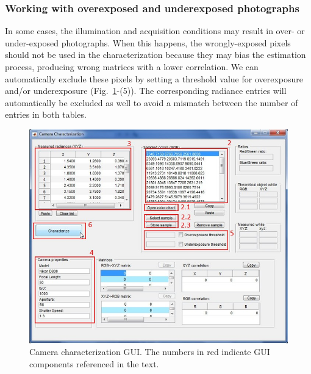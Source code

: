 \documentclass[a4paper,12pt,oneside]{article}
\begin{document}
\subsubsection[Overexposed and underexposed photographs]{Working with overexposed and underexposed photographs}
In some cases, the illumination and acquisition conditions may result in over- or under-exposed photographs. When this happens, the wrongly-exposed pixels should not be used in the characterization because they may bias the estimation process, producing wrong matrices with a lower correlation. We can automatically exclude these pixels by setting a threshold value for overexposure and/or underexposure (Fig.~\ref{fig:camera_characterization_gui}-(5)). The corresponding radiance entries will automatically be excluded as well to avoid a mismatch between the number of entries in both tables.

\begin{figure}[hp]
	\centering
	\includegraphics[width=1\textwidth]{images/camera_characterization_gui.jpg}
	\caption{Camera characterization GUI. The numbers in red indicate GUI components referenced in the text.}
	\label{fig:camera_characterization_gui}
\end{figure}
\end{document}
